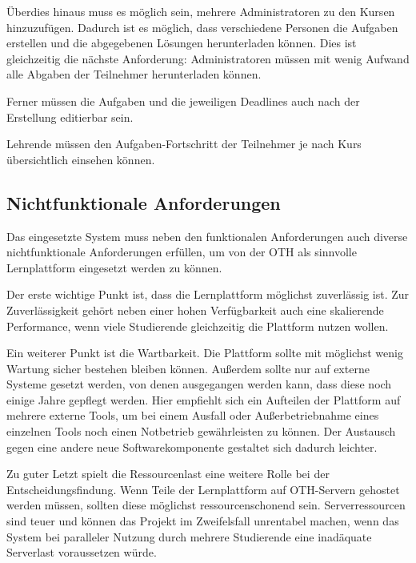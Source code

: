 Überdies hinaus muss es möglich sein, mehrere Administratoren zu den Kursen
hinzuzufügen. Dadurch ist es möglich, dass verschiedene Personen die Aufgaben
erstellen und die abgegebenen Lösungen herunterladen können. Dies ist
gleichzeitig die nächste Anforderung: Administratoren müssen mit wenig
Aufwand alle Abgaben der Teilnehmer herunterladen können.

Ferner müssen die Aufgaben und die jeweiligen Deadlines auch nach der Erstellung
editierbar sein.

Lehrende müssen den Aufgaben-Fortschritt der Teilnehmer je nach Kurs 
übersichtlich einsehen können.
\subsection{Nichtfunktionale Anforderungen}
Das eingesetzte System muss neben den funktionalen Anforderungen auch diverse
nichtfunktionale Anforderungen erfüllen, um von der OTH als sinnvolle
Lernplattform eingesetzt werden zu können.

Der erste wichtige Punkt ist, dass die Lernplattform möglichst zuverlässig ist.
Zur Zuverlässigkeit gehört neben einer hohen Verfügbarkeit auch eine skalierende
Performance, wenn viele Studierende gleichzeitig die Plattform nutzen wollen.

Ein weiterer Punkt ist die Wartbarkeit. Die Plattform sollte mit möglichst wenig
Wartung sicher bestehen bleiben können. Außerdem sollte nur auf externe Systeme
gesetzt werden, von denen ausgegangen werden kann, dass diese noch einige Jahre
gepflegt werden. Hier empfiehlt sich ein Aufteilen der Plattform auf mehrere
externe Tools, um bei einem Ausfall oder Außerbetriebnahme eines einzelnen Tools
noch einen Notbetrieb gewährleisten zu können. Der Austausch gegen eine andere
neue Softwarekomponente gestaltet sich dadurch leichter.

Zu guter Letzt spielt die Ressourcenlast eine weitere Rolle bei der
Entscheidungsfindung. Wenn Teile der Lernplattform auf OTH-Servern gehostet
werden müssen, sollten diese möglichst ressourcenschonend sein. Serverressourcen
sind teuer und können das Projekt im Zweifelsfall unrentabel machen, wenn das
System bei paralleler Nutzung durch mehrere Studierende eine inadäquate
Serverlast voraussetzen würde.